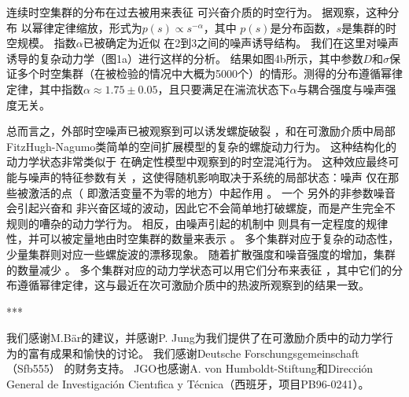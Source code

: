 \documentclass[
bachelor,
nofont, %
pdflinks,
]{xjtuthesis}
\begin{document}
\medskip
连续时空集群的分布在过去被⽤来表征
可兴奋介质的时空⾏为。 据观察，这种分布
以幂律定律缩放，形式为$p(s)\propto s^{-\alpha}$，其中 $p(s)$是分布函数，$s$是集群的时空规模。 指数$\alpha$已被确定为近似
在2到3之间的噪声诱导结构。 我们在这⾥对噪声诱导的复杂动⼒学（图1a）进⾏这样的分析。 结果如图4b所⽰，其中参数$D$和$\sigma$保证多个时空集群（在被检验的情况中大概为5000个）的情形。测得的分布遵循幂律定律，其中指数$\alpha \approx 1.75\pm 0.05$，且只要满足在湍流状态下$\alpha$与耦合强度与噪声强度无关。

\medskip
总而言之，外部时空噪声已被观察到可以诱发螺旋破裂
，和在可激励介质中局部FitzHugh-Nagumo类简单的空间扩展模型的复杂的螺旋动⼒行为。 这种结构化的动⼒学状态⾮常类似于
在确定性模型中观察到的时空混沌⾏为。 这种效应最终可能与噪声的特征参数有关
，这使得随机影响取决于系统的局部状态：噪声
仅在那些被激活的点（ 即激活变量不为零的地⽅）中起作⽤ 。 ⼀个
另外的⾮参数噪⾳会引起兴奋和
⾮兴奋区域的波动，因此它不会简单地打破螺旋，⽽是产⽣完全不规则的嘈杂的动力学行为。 相反，由噪声引起的机制中
则具有⼀定程度的规律性，并可以被定量地由时空集群的数量来表示
。 多个集群对应于复杂的动态性，少量集群则对应一些螺旋波的漂移现象。 
随着扩散强度和噪⾳强度的增加，集群的数量减少
。 多个集群对应的动力学状态可以⽤它们分布来表征
，其中它们的分布遵循幂律定律，这与最近在次可激励介质中的热波所观察到的结果⼀致。

\bigskip
\begin{center}
***
\end{center}

我们感谢M.Bär的建议，并感谢P. Jung为我们提供了在可激励介质中的动力学行为的富有成果和愉快的讨论。 我们感谢Deutsche Forschungsgemeinschaft（Sfb555）
的财务⽀持。 JGO也感谢A. von Humboldt-Stiftung和Dirección
General de Investigación Cientıfica y Técnica（西班⽛，项⽬PB96-0241）。

\xjtuendappendix

\end{document}
